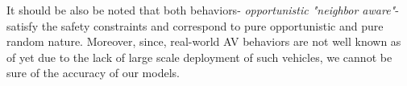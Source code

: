 \documentclass[oneside,letter,11pt]{article}
\begin{document}
It should be also be noted that both behaviors- \textit{opportunistic  "neighbor aware"}- satisfy the safety constraints and correspond to pure opportunistic and pure random nature. Moreover, since, real-world AV behaviors are not well known as of yet due to the lack of large scale deployment of such vehicles, we cannot be sure of the accuracy of our models.

\end{document}
